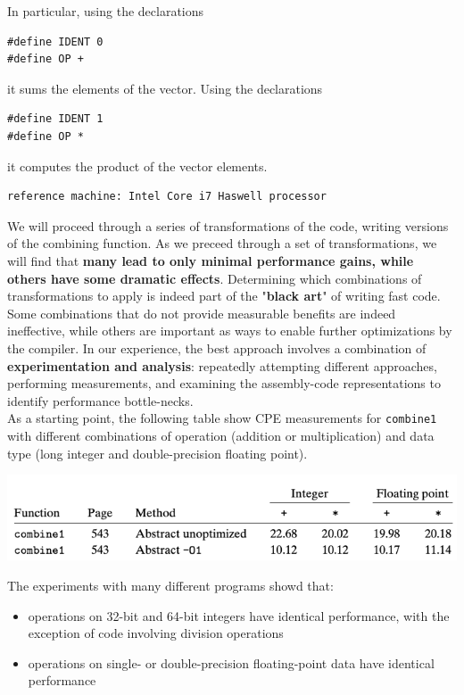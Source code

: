 \documentclass[11pt]{article}
\begin{document}
In particular, using the declarations\\
\begin{verbatim}
#define IDENT 0
#define OP +
\end{verbatim}
it sums the elements of the vector. Using the declarations\\
\begin{verbatim}
#define IDENT 1
#define OP *
\end{verbatim}
it computes the product of the vector elements.\\

\begin{verbatim}
reference machine: Intel Core i7 Haswell processor
\end{verbatim}
We will proceed through a series of transformations of the code, writing versions of the combining function. As we preceed through a set of transformations, we will find that \textbf{many lead to only minimal performance gains, while others have some dramatic effects}. Determining which combinations of transformations to apply is indeed part of the "\textbf{black art}" of writing fast code. Some combinations that do not provide measurable benefits are indeed ineffective, while others are important as ways to enable further optimizations by the compiler. In our experience, the best approach involves a combination of \textbf{experimentation and analysis}: repeatedly attempting different approaches, performing measurements, and examining the assembly-code representations to identify performance bottle-necks.\\

As a starting point, the following table show CPE measurements for \texttt{combine1} with different combinations of operation (addition or multiplication) and data type (long integer and double-precision floating point).\\

\begin{center}
\includegraphics[width=.9\linewidth]{pics/combine1-table.png}
\end{center}

The experiments with many different programs showd that:\\
\begin{itemize}
\item operations on 32-bit and 64-bit integers have identical performance, with the exception of code involving division operations\\
\item operations on single- or double-precision floating-point data have identical performance\\
\end{itemize}
\end{document}

